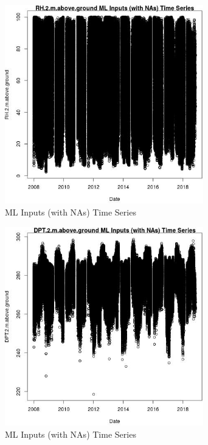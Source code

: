 \begin{figure} 
\centering  
\includegraphics[width=0.77\textwidth]{Code_Outputs/Report_ML_input_PM25_Step4_part_e_de_duplicated_aves_compiled_2019-05-20wNAs_RH2mabovegroundvDate.jpg} 
\caption{\label{fig:Report_ML_input_PM25_Step4_part_e_de_duplicated_aves_compiled_2019-05-20wNAsRH2mabovegroundvDate}ML Inputs (with NAs) Time Series} 
\end{figure} 
 

\begin{figure} 
\centering  
\includegraphics[width=0.77\textwidth]{Code_Outputs/Report_ML_input_PM25_Step4_part_e_de_duplicated_aves_compiled_2019-05-20wNAs_DPT2mabovegroundvDate.jpg} 
\caption{\label{fig:Report_ML_input_PM25_Step4_part_e_de_duplicated_aves_compiled_2019-05-20wNAsDPT2mabovegroundvDate}ML Inputs (with NAs) Time Series} 
\end{figure} 
 

